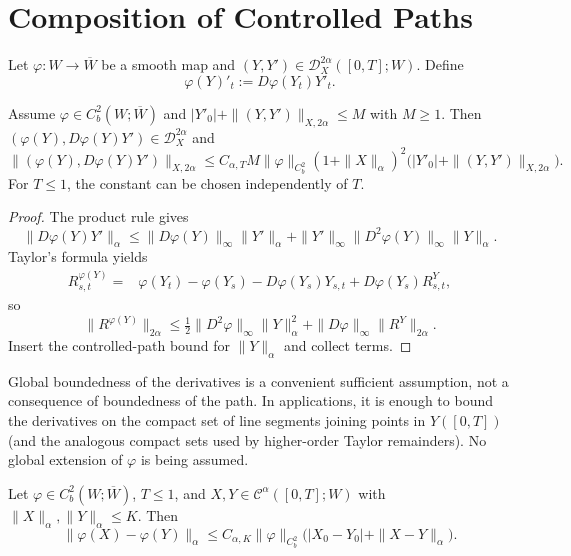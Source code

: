 \section{Composition of Controlled Paths}

Let $\varphi\colon W\to\overline W$ be a smooth map and
$(Y,Y')\in\mathscr D_X^{2\alpha}([0,T];W)$.  Define
\[
  \varphi(Y)'_t:=D\varphi(Y_t)Y'_t.
\]

\begin{lem}
Assume $\varphi\in C_b^2(W;\overline W)$ and
$|Y'_0|+\|(Y,Y')\|_{X,2\alpha}\le M$ with $M\ge1$.  Then
$(\varphi(Y),D\varphi(Y)Y')\in\mathscr D_X^{2\alpha}$ and
\[
 \|(\varphi(Y),D\varphi(Y)Y')\|_{X,2\alpha}
 \le C_{\alpha,T}M\|\varphi\|_{C_b^2}(1+\|X\|_\alpha)^2
       \bigl(|Y'_0|+\|(Y,Y')\|_{X,2\alpha}\bigr).
\]
For $T\le1$, the constant can be chosen independently of $T$.
\end{lem}

\begin{proof}
The product rule gives
\[
 \|D\varphi(Y)Y'\|_\alpha
 \le \|D\varphi(Y)\|_\infty\|Y'\|_\alpha
 +\|Y'\|_\infty\|D^2\varphi(Y)\|_\infty\|Y\|_\alpha.
\]
Taylor's formula yields
\begin{align*}
R^{\varphi(Y)}_{s,t}
={}&\varphi(Y_t)-\varphi(Y_s)-D\varphi(Y_s)Y_{s,t}
   +D\varphi(Y_s)R^Y_{s,t},
\end{align*}
so
\[
 \|R^{\varphi(Y)}\|_{2\alpha}
 \le \tfrac12\|D^2\varphi\|_\infty\|Y\|_\alpha^2
      +\|D\varphi\|_\infty\|R^Y\|_{2\alpha}.
\]
Insert the controlled-path bound for $\|Y\|_\alpha$ and collect terms.
\end{proof}

\begin{remark}
Global boundedness of the derivatives is a convenient sufficient assumption,
not a consequence of boundedness of the path.  In applications, it is enough
to bound the derivatives on the compact set of line segments joining points in
$Y([0,T])$ (and the analogous compact sets used by higher-order Taylor
remainders).  No global extension of $\varphi$ is being assumed.
\end{remark}

\begin{lem}
Let $\varphi\in C_b^2(W;\overline W)$, $T\le1$, and
$X,Y\in\mathcal C^\alpha([0,T];W)$ with
$\|X\|_\alpha,\|Y\|_\alpha\le K$.  Then
\[
  \|\varphi(X)-\varphi(Y)\|_\alpha
  \le C_{\alpha,K}\|\varphi\|_{C_b^2}
     \bigl(|X_0-Y_0|+\|X-Y\|_\alpha\bigr).
\]
\end{lem}

